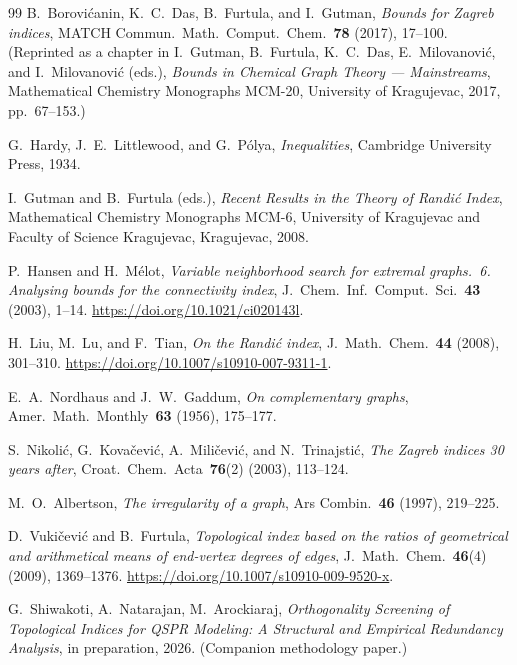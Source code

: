\documentclass[11pt,a4paper]{article}
\theoremstyle{definition}
\begin{document}
\begin{thebibliography}{99}
B.~Borovi\'canin, K.~C.~Das, B.~Furtula, and I.~Gutman,
\emph{Bounds for Zagreb indices},
MATCH Commun.~Math.~Comput.~Chem.~\textbf{78} (2017), 17--100.
(Reprinted as a chapter in I.~Gutman, B.~Furtula, K.~C.~Das,
E.~Milovanovi\'c, and I.~Milovanovi\'c (eds.),
\emph{Bounds in Chemical Graph Theory --- Mainstreams},
Mathematical Chemistry Monographs MCM-20,
University of Kragujevac, 2017, pp.~67--153.)

G.~Hardy, J.~E.~Littlewood, and G.~P\'olya,
\emph{Inequalities},
Cambridge University Press, 1934.

I.~Gutman and B.~Furtula (eds.),
\emph{Recent Results in the Theory of Randi\'c Index},
Mathematical Chemistry Monographs MCM-6,
University of Kragujevac and Faculty of Science Kragujevac,
Kragujevac, 2008.

P.~Hansen and H.~M\'elot,
\emph{Variable neighborhood search for extremal graphs.~6.
Analysing bounds for the connectivity index},
J.~Chem.~Inf.~Comput.~Sci.~\textbf{43} (2003), 1--14.
\url{https://doi.org/10.1021/ci020143l}.

H.~Liu, M.~Lu, and F.~Tian,
\emph{On the Randi\'c index},
J.~Math.~Chem.~\textbf{44} (2008), 301--310.
\url{https://doi.org/10.1007/s10910-007-9311-1}.

E.~A.~Nordhaus and J.~W.~Gaddum,
\emph{On complementary graphs},
Amer.~Math.~Monthly~\textbf{63} (1956), 175--177.

S.~Nikoli\'c, G.~Kova\v{c}evi\'c, A.~Mili\v{c}evi\'c, and N.~Trinajsti\'c,
\emph{The Zagreb indices 30 years after},
Croat.~Chem.~Acta~\textbf{76}(2) (2003), 113--124.

M.~O.~Albertson,
\emph{The irregularity of a graph},
Ars Combin.~\textbf{46} (1997), 219--225.

D.~Vuki\v{c}evi\'c and B.~Furtula,
\emph{Topological index based on the ratios of geometrical
and arithmetical means of end-vertex degrees of edges},
J.~Math.~Chem.~\textbf{46}(4) (2009), 1369--1376.
\url{https://doi.org/10.1007/s10910-009-9520-x}.

G.~Shiwakoti, A.~Natarajan, M.~Arockiaraj,
\emph{Orthogonality Screening of Topological Indices for QSPR Modeling:
A Structural and Empirical Redundancy Analysis},
in preparation, 2026.
(Companion methodology paper.)

\end{thebibliography}
\end{document}
